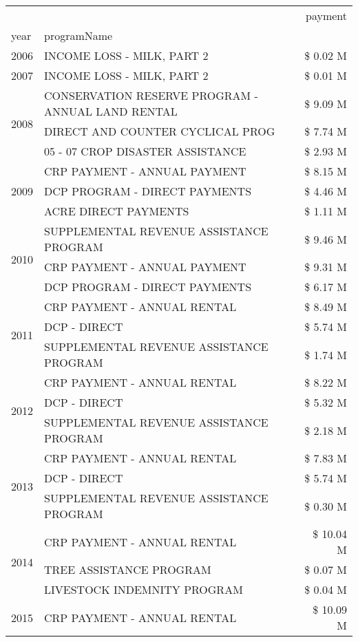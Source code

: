 \begin{tabular}{llr}
\toprule
 &  & payment \\
year & programName &  \\
\midrule
2006 & INCOME LOSS - MILK, PART 2 & \$ 0.02 M \\
\cline{1-3}
2007 & INCOME LOSS - MILK, PART 2 & \$ 0.01 M \\
\cline{1-3}
\multirow[t]{3}{*}{2008} & CONSERVATION RESERVE PROGRAM - ANNUAL LAND RENTAL & \$ 9.09 M \\
 & DIRECT AND COUNTER CYCLICAL PROG & \$ 7.74 M \\
 & 05 - 07 CROP DISASTER ASSISTANCE & \$ 2.93 M \\
\cline{1-3}
\multirow[t]{3}{*}{2009} & CRP PAYMENT - ANNUAL PAYMENT & \$ 8.15 M \\
 & DCP PROGRAM - DIRECT PAYMENTS & \$ 4.46 M \\
 & ACRE DIRECT PAYMENTS & \$ 1.11 M \\
\cline{1-3}
\multirow[t]{3}{*}{2010} & SUPPLEMENTAL REVENUE ASSISTANCE PROGRAM & \$ 9.46 M \\
 & CRP PAYMENT - ANNUAL PAYMENT & \$ 9.31 M \\
 & DCP PROGRAM - DIRECT PAYMENTS & \$ 6.17 M \\
\cline{1-3}
\multirow[t]{3}{*}{2011} & CRP PAYMENT - ANNUAL RENTAL & \$ 8.49 M \\
 & DCP - DIRECT & \$ 5.74 M \\
 & SUPPLEMENTAL REVENUE ASSISTANCE PROGRAM & \$ 1.74 M \\
\cline{1-3}
\multirow[t]{3}{*}{2012} & CRP PAYMENT - ANNUAL RENTAL & \$ 8.22 M \\
 & DCP - DIRECT & \$ 5.32 M \\
 & SUPPLEMENTAL REVENUE ASSISTANCE PROGRAM & \$ 2.18 M \\
\cline{1-3}
\multirow[t]{3}{*}{2013} & CRP PAYMENT - ANNUAL RENTAL & \$ 7.83 M \\
 & DCP - DIRECT & \$ 5.74 M \\
 & SUPPLEMENTAL REVENUE ASSISTANCE PROGRAM & \$ 0.30 M \\
\cline{1-3}
\multirow[t]{3}{*}{2014} & CRP PAYMENT - ANNUAL RENTAL & \$ 10.04 M \\
 & TREE ASSISTANCE PROGRAM & \$ 0.07 M \\
 & LIVESTOCK INDEMNITY PROGRAM & \$ 0.04 M \\
\cline{1-3}
\multirow[t]{3}{*}{2015} & CRP PAYMENT - ANNUAL RENTAL & \$ 10.09 M \\

\end{tabular}
